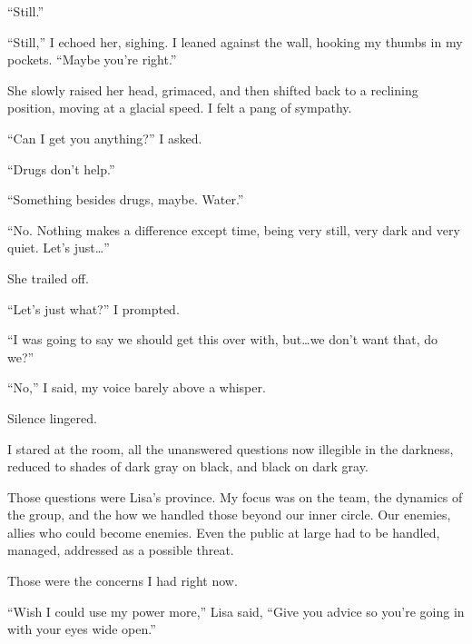 ``Still.''



``Still,'' I echoed her, sighing.  I leaned against the wall, hooking my thumbs in my pockets.  ``Maybe you're right.''



She slowly raised her head, grimaced, and then shifted back to a reclining position, moving at a glacial speed.  I felt a pang of sympathy.



``Can I get you anything?''  I asked.



``Drugs don't help.''



``Something besides drugs, maybe.  Water.''



``No.  Nothing makes a difference except time, being very still, very dark and very quiet.  Let's just\ldots''



She trailed off.



``Let's just what?'' I prompted.



``I was going to say we should get this over with, but\ldots we don't want that, do we?''



``No,'' I said, my voice barely above a whisper.



Silence lingered.



I stared at the room, all the unanswered questions now illegible in the darkness, reduced to shades of dark gray on black, and black on dark gray.



Those questions were Lisa's province.  My focus was on the team, the dynamics of the group, and the how we handled those beyond our inner circle.  Our enemies, allies who could become enemies.  Even the public at large had to be handled, managed, addressed as a possible threat.



Those were the concerns I had right now.



``Wish I could use my power more,'' Lisa said, ``Give you advice so you're going in with your eyes wide open.''



